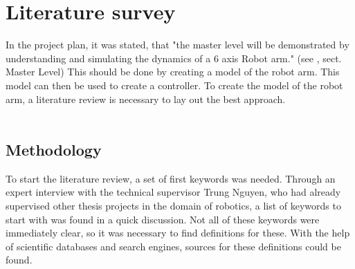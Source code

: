 \chapter{Literature survey}

In the project plan, it was stated, that "the master level will be demonstrated by understanding and simulating the dynamics of a 6 axis Robot arm." (see \cite{ProjectPlan}, sect. Master Level)
This should be done by creating a model of the robot arm. This model can then be used to create a controller.
To create the model of the robot arm, a literature review is necessary to lay out the best approach.\\
\\ 


\bigskip




\section{Methodology}

To start the literature review, a set of first keywords was needed. Through an expert interview with the technical supervisor Trung Nguyen, %
who had already supervised other thesis projects in the domain of robotics, a list of keywords to start with was found in a quick discussion. 
Not all of these keywords were immediately clear, so it was necessary to find definitions for these. 
With the help of scientific databases and search engines, sources for these definitions could be found.\\




